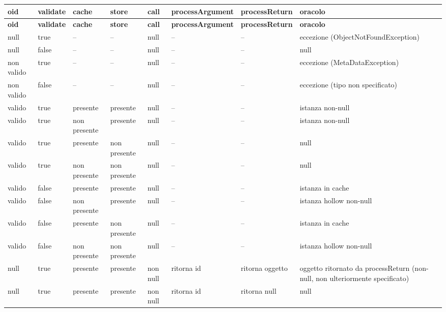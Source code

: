 {\footnotesize\setlength{\tabcolsep}{3pt}
\begin{longtable}{>{\raggedright\arraybackslash}p{}>{\raggedright\arraybackslash}p{}>{\raggedright\arraybackslash}p{}>{\raggedright\arraybackslash}p{}>{\raggedright\arraybackslash}p{}>{\raggedright\arraybackslash}p{}>{\raggedright\arraybackslash}p{}>{\raggedright\arraybackslash}p{}}
\toprule
\textbf{oid} & \textbf{validate} & \textbf{cache} & \textbf{store} & \textbf{call} & \textbf{processArgument} & \textbf{processReturn} & \textbf{oracolo} \\
\midrule
\endfirsthead
\toprule
\textbf{oid} & \textbf{validate} & \textbf{cache} & \textbf{store} & \textbf{call} & \textbf{processArgument} & \textbf{processReturn} & \textbf{oracolo} \\
\midrule
\endhead
\bottomrule
\endfoot
null & true & -- & -- & null & -- & -- & eccezione (ObjectNotFoundException) \\
null & false & -- & -- & null & -- & -- & null \\
non valido & true & -- & -- & null & -- & -- & eccezione (MetaDataException) \\
non valido & false & -- & -- & null & -- & -- & eccezione (tipo non specificato) \\
valido & true & presente & presente & null & -- & -- & istanza non-null \\
valido & true & non presente & presente & null & -- & -- & istanza non-null \\
valido & true & presente & non presente & null & -- & -- & null \\
valido & true & non presente & non presente & null & -- & -- & null \\
valido & false & presente & presente & null & -- & -- & istanza in cache \\
valido & false & non presente & presente & null & -- & -- & istanza hollow non-null \\
valido & false & presente & non presente & null & -- & -- & istanza in cache \\
valido & false & non presente & non presente & null & -- & -- & istanza hollow non-null \\
null & true & presente & presente & non null & ritorna id & ritorna oggetto & oggetto ritornato da processReturn (non-null, non ulteriormente specificato) \\
null & true & presente & presente & non null & ritorna id & ritorna null & null \\

\end{longtable}}
